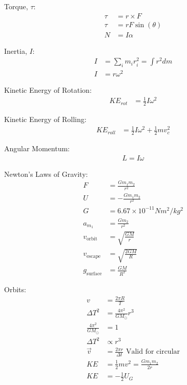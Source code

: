 \documentclass[10pt, letterpaper]{book}
\begin{document}
\begin{multicols*}{2}
        Torque, $\tau$:
        \begin{align}
            \tau & = r \times F     \\
            \tau & = rF\sin(\theta) \\
            N    & = I\alpha        
        \end{align}

        Inertia, $I$:
        \begin{align}
            I   & = \sum_{i}m_{i}r_{i}^{2} = \int r^{2}dm   \\
            I   & = r\omega^{2}
        \end{align}

        Kinetic Energy of Rotation:
        \begin{align}
            KE_{rot}  & = \frac{1}{2}I\omega^{2}
        \end{align}

        Kinetic Energy of Rolling:
        \begin{align}
            KE_{roll} & = \frac{1}{2}I\omega^{2} + \frac{1}{2}mv_{c}^{2}    
        \end{align}

        Angular Momentum:
        \begin{align}
            L = I\omega
        \end{align}

        Newton's Laws of Gravity:
        \begin{align}
            F   & = \frac{Gm_{1}m_{2}}{r^{2}}           \\
            U   & = -\frac{Gm_{1}m_{2}}{r^{2}}          \\
            G   & = 6.67 \times 10^{-11}Nm^{2}/kg^{2}   \\
            a_{m_{1}}   
                & = \frac{Gm_{2}}{r^{2}}                \\
            v_{\text{orbit}}   
                & = \sqrt{\frac{GM}{r}}                 \\
            v_{\text{escape}}
                & = \sqrt{\frac{2GM}{R}}                \\
            g_{\text{surface}} 
                    & = \frac{GM}{R^{2}}
        \end{align}

        Orbits:
        \begin{align}
            v   & = \frac{2 \pi R}{T}                           \\
            \Delta T^{2}   & = \frac{4\pi^{2}}{GM_{\odot}}r^{3} \\
            \frac{4\pi^{2}}{GM_{\odot}} & = 1                   \\
            \Delta T^{2} & \propto r^{3}                        \\
            \vec{v} & = \frac{2\pi r}{\Delta t} 
            \text{ Valid for circular}                          \\
            KE  & = \frac{1}{2}mv^{2} = \frac{Gm_{1}m_{2}}{2r}  \\
            KE  & = -\frac{1}{2}U_{G}         
        \end{align}


\end{multicols*}
\end{document}
